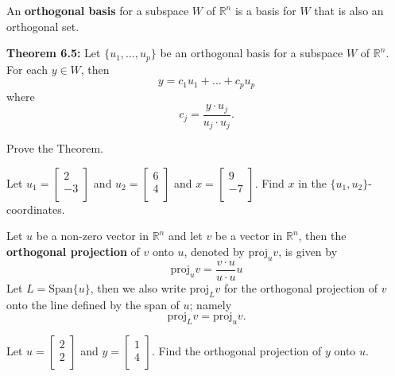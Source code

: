 \newpage

\begin{defn} An {\bf orthogonal basis} for a subspace $W$ of $\mathbb{R}^n$ is a basis for $W$ that is also an orthogonal set.
\end{defn}

{\bf Theorem 6.5:} Let $\{u_1, \dots,u_p\}$ be an orthogonal basis for a subspace $W$ of $\mathbb{R}^n$. For each $y\in W$, then $$y=c_1 u_1+\dots+c_p u_p$$ where $$c_j=\frac{y\cdot u_j}{u_j \cdot u_j}.$$

\begin{enumerate}

\Problem Prove the Theorem.





\vfill


\Problem Let $u_1=\begin{bmatrix} 2\\ -3\\ \end{bmatrix}$ and $u_2= \begin{bmatrix} 6\\4\\ \end{bmatrix}$ and $x=\begin{bmatrix} 9\\ -7\\ \end{bmatrix}$. Find $x$ in the $\{u_1, u_2\}$-coordinates.

\vfill


\newpage

\begin{defn} Let $u$ be a non-zero vector in $\mathbb{R}^n$ and let $v$ be a vector in $\mathbb{R}^n$, then the {\bf orthogonal projection} of $v$ onto $u$, denoted by $\text{proj}_{u}{v}$, is given by $$\text{proj}_{u}{v}=\frac{v\cdot u}{u \cdot u} u$$ Let $L=\text{Span}\{ u\}$, then we also write $\text{proj}_{L}{v}$ for the orthogonal projection of $v$ onto the line defined by the span of $u$; namely $$\text{proj}_{L}{v}=\text{proj}_{u}{v}.$$
\end{defn}

\Problem Let $u=\begin{bmatrix} 2\\ 2\\ \end{bmatrix}$ and $y= \begin{bmatrix} 1\\4\\ \end{bmatrix}$. Find the orthogonal projection of $y$ onto $u$.


\end{enumerate}
